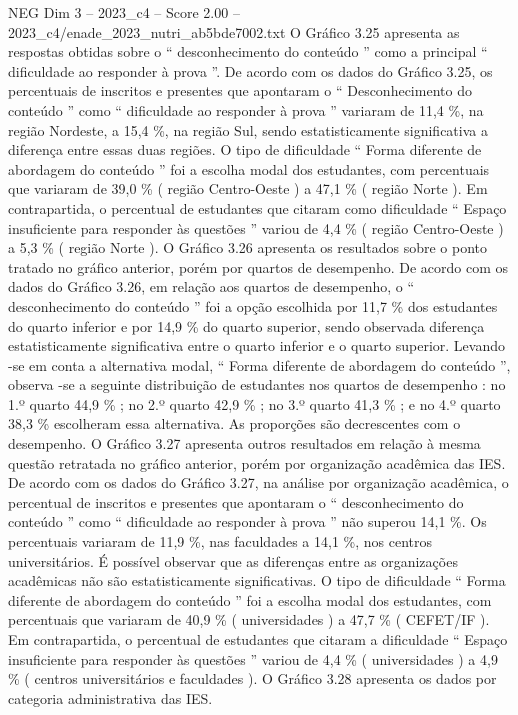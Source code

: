 \begin{textsample}{NEG Dim 3 – 2023\_c4 – Score 2.00 – 2023\_c4/enade\_2023\_nutri\_ab5bde7002.txt}
O Gráfico 3.25 apresenta as respostas obtidas sobre o “ desconhecimento do conteúdo ” como a principal “ dificuldade ao responder à prova ”.
De acordo com os dados do Gráfico 3.25, os percentuais de inscritos e presentes que apontaram o “ Desconhecimento do conteúdo ” como “ dificuldade ao responder à prova ” variaram de 11,4 \%, na região Nordeste, a 15,4 \%, na região Sul, sendo estatisticamente significativa a diferença entre essas duas regiões.
O tipo de dificuldade “ Forma diferente de abordagem do conteúdo ” foi a escolha modal dos estudantes, com percentuais que variaram de 39,0 \% ( região Centro-Oeste ) a 47,1 \% ( região Norte ).
Em contrapartida, o percentual de estudantes que citaram como dificuldade “ Espaço insuficiente para responder às questões ” variou de 4,4 \% ( região Centro-Oeste ) a 5,3 \% ( região Norte ).
O Gráfico 3.26 apresenta os resultados sobre o ponto tratado no gráfico anterior, porém por quartos de desempenho.
De acordo com os dados do Gráfico 3.26, em relação aos quartos de desempenho, o “ desconhecimento do conteúdo ” foi a opção escolhida por 11,7 \% dos estudantes do quarto inferior e por 14,9 \% do quarto superior, sendo observada diferença estatisticamente significativa entre o quarto inferior e o quarto superior.
Levando -se em conta a alternativa modal, “ Forma diferente de abordagem do conteúdo ”, observa -se a seguinte distribuição de estudantes nos quartos de desempenho : no 1.º quarto 44,9 \% ; no 2.º quarto 42,9 \% ; no 3.º quarto 41,3 \% ; e no 4.º quarto 38,3 \% escolheram essa alternativa.
As proporções são decrescentes com o desempenho.
O Gráfico 3.27 apresenta outros resultados em relação à mesma questão retratada no gráfico anterior, porém por organização acadêmica das IES.
De acordo com os dados do Gráfico 3.27, na análise por organização acadêmica, o percentual de inscritos e presentes que apontaram o “ desconhecimento do conteúdo ” como “ dificuldade ao responder à prova ” não superou 14,1 \%.
Os percentuais variaram de 11,9 \%, nas faculdades a 14,1 \%, nos centros universitários.
É possível observar que as diferenças entre as organizações acadêmicas não são estatisticamente significativas.
O tipo de dificuldade “ Forma diferente de abordagem do conteúdo ” foi a escolha modal dos estudantes, com percentuais que variaram de 40,9 \% ( universidades ) a 47,7 \% ( CEFET/IF ).
Em contrapartida, o percentual de estudantes que citaram a dificuldade “ Espaço insuficiente para responder às questões ” variou de 4,4 \% ( universidades ) a 4,9 \% ( centros universitários e faculdades ).
O Gráfico 3.28 apresenta os dados por categoria administrativa das IES.

\end{textsample}
